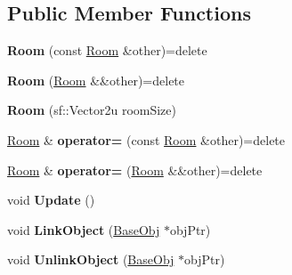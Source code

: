 \subsection*{Public Member Functions}
\begin{DoxyCompactItemize}
\item 
\hypertarget{classhelios_1_1_room_abd56a5a1feb0cdf8f470505064d01349}{}{\bfseries Room} (const \hyperlink{classhelios_1_1_room}{Room} \&other)=delete\label{classhelios_1_1_room_abd56a5a1feb0cdf8f470505064d01349}

\item 
\hypertarget{classhelios_1_1_room_a467a31cbc493d2171174592a2c0368fc}{}{\bfseries Room} (\hyperlink{classhelios_1_1_room}{Room} \&\&other)=delete\label{classhelios_1_1_room_a467a31cbc493d2171174592a2c0368fc}

\item 
\hypertarget{classhelios_1_1_room_a22edd48763b962235424ac0d8cfa222e}{}{\bfseries Room} (sf\+::\+Vector2u room\+Size)\label{classhelios_1_1_room_a22edd48763b962235424ac0d8cfa222e}

\item 
\hypertarget{classhelios_1_1_room_ac96f0cf36c6e439e1418ff0d2c7a5f5e}{}\hyperlink{classhelios_1_1_room}{Room} \& {\bfseries operator=} (const \hyperlink{classhelios_1_1_room}{Room} \&other)=delete\label{classhelios_1_1_room_ac96f0cf36c6e439e1418ff0d2c7a5f5e}

\item 
\hypertarget{classhelios_1_1_room_aa00773523933fc91134d8d70a8c3a5ce}{}\hyperlink{classhelios_1_1_room}{Room} \& {\bfseries operator=} (\hyperlink{classhelios_1_1_room}{Room} \&\&other)=delete\label{classhelios_1_1_room_aa00773523933fc91134d8d70a8c3a5ce}

\item 
\hypertarget{classhelios_1_1_room_adfb6e5efebf8adaf1b1f008f1a3185ce}{}void {\bfseries Update} ()\label{classhelios_1_1_room_adfb6e5efebf8adaf1b1f008f1a3185ce}

\item 
\hypertarget{classhelios_1_1_room_a79f2977c22d220a2da05e04d12fdb4f4}{}void {\bfseries Link\+Object} (\hyperlink{classhelios_1_1_base_obj}{Base\+Obj} $\ast$obj\+Ptr)\label{classhelios_1_1_room_a79f2977c22d220a2da05e04d12fdb4f4}

\item 
\hypertarget{classhelios_1_1_room_ac078f4e9c01293e20be856b6e726f50d}{}void {\bfseries Unlink\+Object} (\hyperlink{classhelios_1_1_base_obj}{Base\+Obj} $\ast$obj\+Ptr)\label{classhelios_1_1_room_ac078f4e9c01293e20be856b6e726f50d}

\end{DoxyCompactItemize}


